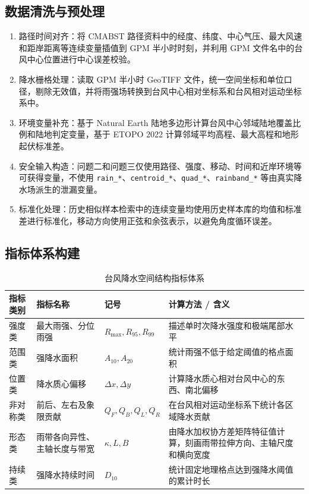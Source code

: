 \documentclass[UTF8,a4paper,zihao=5,fontset=fandol]{ctexart}
\numberwithin{equation}{section}
\numberwithin{figure}{section}
\numberwithin{table}{section}
\begin{document}
\subsection{数据清洗与预处理}
\begin{enumerate}
  \item 路径时间对齐：将 CMABST 路径资料中的经度、纬度、中心气压、最大风速和距岸距离等连续变量插值到 GPM 半小时时刻，并利用 GPM 文件名中的台风中心位置进行中心误差校验。
  \item 降水栅格处理：读取 GPM 半小时 GeoTIFF 文件，统一空间坐标和单位口径，剔除无效值，并将雨强场转换到台风中心相对坐标系和台风相对运动坐标系中。
  \item 环境变量补充：基于 Natural Earth 陆地多边形计算台风中心邻域陆地覆盖比例和陆地判定变量，基于 ETOPO 2022 计算邻域平均高程、最大高程和地形起伏标准差。
  \item 安全输入构造：问题二和问题三仅使用路径、强度、移动、时间和近岸环境等可获得变量，不使用 \texttt{rain\_*}、\texttt{centroid\_*}、\texttt{quad\_*}、\texttt{rainband\_*} 等由真实降水场派生的泄漏变量。
  \item 标准化处理：历史相似样本检索中的连续变量均使用历史样本库的均值和标准差进行标准化，移动方向使用正弦和余弦表示，以避免角度循环误差。
\end{enumerate}

\subsection{指标体系构建}
\begin{table}[H]
  \centering
  \caption{台风降水空间结构指标体系}
  \begin{tabularx}{\linewidth}{lXlX}
    \toprule
    指标类别 & 指标名称 & 记号 & 计算方法 / 含义 \\
    \midrule
    强度类 & 最大雨强、分位雨强 & $R_{\max},R_{95},R_{99}$ & 描述单时次降水强度和极端尾部水平 \\
    范围类 & 强降水面积 & $A_{10},A_{20}$ & 统计雨强不低于给定阈值的格点面积 \\
    位置类 & 降水质心偏移 & $\Delta x,\Delta y$ & 计算降水质心相对台风中心的东西、南北偏移 \\
    非对称类 & 前后、左右及象限贡献 & $Q_F,Q_B,Q_L,Q_R$ & 在台风相对运动坐标系下统计各区域降水贡献 \\
    形态类 & 雨带各向异性、主轴长度与带宽 & $\kappa,L,B$ & 由降水加权协方差矩阵特征值计算，刻画雨带拉伸方向、主轴尺度和横向宽度 \\
    持续类 & 强降水持续时间 & $D_{10}$ & 统计固定地理格点达到强降水阈值的累计时长 \\
    \bottomrule
  \end{tabularx}
\end{table}
\end{document}
